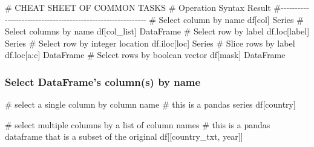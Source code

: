 \documentclass[
  letterpaper,
  DIV=11,
  numbers=noendperiod]{scrreprt}
\newenvironment{Shaded}{\begin{snugshade}}{\end{snugshade}}
\newcommand{\CommentTok}[1]{\textcolor[rgb]{0.37,0.37,0.37}{#1}}
\newcommand{\NormalTok}[1]{\textcolor[rgb]{0.00,0.23,0.31}{#1}}
\newcommand{\StringTok}[1]{\textcolor[rgb]{0.13,0.47,0.30}{#1}}
\begin{document}
\begin{Shaded}
\begin{Highlighting}[]
\CommentTok{\# CHEAT SHEET OF COMMON TASKS}
\CommentTok{\# Operation                       Syntax           Result}
\CommentTok{\#{-}{-}{-}{-}{-}{-}{-}{-}{-}{-}{-}{-}{-}{-}{-}{-}{-}{-}{-}{-}{-}{-}{-}{-}{-}{-}{-}{-}{-}{-}{-}{-}{-}{-}{-}{-}{-}{-}{-}{-}{-}{-}{-}{-}{-}{-}{-}{-}{-}{-}{-}{-}{-}{-}{-}{-}{-}{-}{-}{-}}
\CommentTok{\# Select column by name           df[col]          Series}
\CommentTok{\# Select columns by name          df[col\_list]     DataFrame}
\CommentTok{\# Select row by label             df.loc[label]    Series}
\CommentTok{\# Select row by integer location  df.iloc[loc]     Series}
\CommentTok{\# Slice rows by label             df.loc[a:c]      DataFrame}
\CommentTok{\# Select rows by boolean vector   df[mask]         DataFrame}
\end{Highlighting}
\end{Shaded}

\hypertarget{select-dataframes-columns-by-name}{%
\subsubsection{Select DataFrame's column(s) by
name}\label{select-dataframes-columns-by-name}}

\begin{Shaded}
\begin{Highlighting}[]
\CommentTok{\# select a single column by column name}
\CommentTok{\# this is a pandas series}
\NormalTok{df[}\StringTok{\textquotesingle{}country\textquotesingle{}}\NormalTok{]}
\end{Highlighting}
\end{Shaded}

\begin{Shaded}
\begin{Highlighting}[]
\CommentTok{\# select multiple columns by a list of column names}
\CommentTok{\# this is a pandas dataframe that is a subset of the original}
\NormalTok{df[[}\StringTok{\textquotesingle{}country\_txt\textquotesingle{}}\NormalTok{, }\StringTok{\textquotesingle{}year\textquotesingle{}}\NormalTok{]]}
\end{Highlighting}
\end{Shaded}
\end{document}
